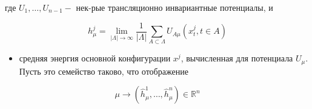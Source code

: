 \documentclass[10pt]{article}
\begin{document}
где $U_{1}, \ldots, U_{n-1}-$ нек-рые трансляционно инвариантные потенциалы, и



\[

h_{\mu}^{j}=\lim _{|\Lambda| \rightarrow \infty} \frac{1}{|\Lambda|} \sum_{A \subset \Lambda} U_{A \mu}\left(x_{t}^{j}, t \in A\right)

\]



\begin{itemize}

  \item средняя энергия основной конфигурации $x^{j}$, вычисленная для потенциала $U_{\mu}$. Пусть это семейство таково, что отображение

\end{itemize}



\[

\mu \rightarrow\left(\hat{h}_{\mu}^{1}, \ldots, \hat{h}_{\mu}^{n}\right) \in \mathbb{R}^{n}

\]
\end{document}
